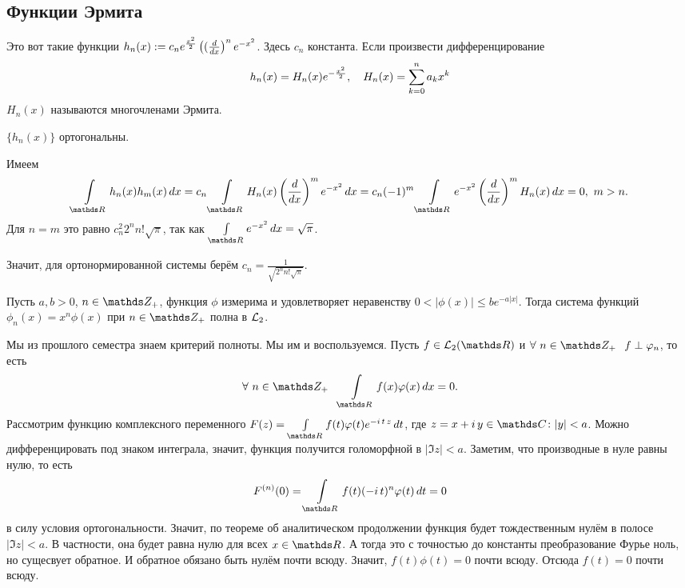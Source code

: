 \subsection{Функции Эрмита}
Это вот такие функции $h_n(x):=c_n e^{\frac{x^2}2}\left((\frac{d }{dx}\right)^ne^{-x^2}$. Здесь $c_n$ константа. Если произвести дифференцирование
\[
  h_n(x) = H_n(x) e^{-\frac{x^2}2},\quad H_n(x) = \sum\limits_{k = 0}^{n} a_k x^k
\]
$H_n(x)$ называются многочленами Эрмита.

\begin{Ut}
$\big\{h_n(x)\big\}$ ортогональны.
\end{Ut}
\begin{Proof}
  Имеем
\[
  \Gint{\R} h_n(x)h_m(x)\,dx = 
  c_n\Gint{\R} H_n(x)\left(\DP { }x\right)^m e^{-x^2}\,dx =
  c_n(-1)^m\Gint{\R} e^{-x^2}\left(\DP { }x\right)^m H_n(x)\,dx = 0,\ m>n.
\]
Для $n=m$ это равно $c_n^2 2^n n!\sqrt{\pi}$, так как $\Gint{\R}e^{-x^2}\,dx = \sqrt\pi$.
\end{Proof}
Значит, для ортонормированной системы берём $c_n = \frac1{\sqrt{2^n n!\sqrt{\pi}}}$.

\begin{Lem}
  Пусть $a,b>0$, $n\in\Z_+$, функция $\phi$ измерима и удовлетворяет неравенству $0<\big|\phi(x)\big|\le b e^{-a|x|}$. Тогда система функций $\phi_n(x) = x^n\phi(x)$ при $n\in\Z_+$ полна в $\mathcal L_2$.
\end{Lem}
\begin{Proof}
Мы из прошлого семестра знаем критерий полноты. Мы им и воспользуемся. Пусть $f\in\L_2(\R)$ и $\forall\ n\in\Z_+\pau f\perp\phi_n$, то есть 
\[
 \forall\ n\in\Z_+\pau \Gint{\R}f(x)\phi(x)\,dx = 0.
\]
Рассмотрим функцию комплексного переменного $F(z) = \Gint{\R}f(t)\phi(t) e^{-i\,t\,z}\,dt$, где $z = x+i\,y\in\C\colon |y|<a$. Можно дифференцировать под знаком интеграла, значит, функция получится голоморфной в $|\Im z|<a$. Заметим, что производные в нуле равны нулю, то есть
\[
  F^{(n)}(0) = \Gint{\R}f(t)(-i\,t)^n\phi(t)\,dt = 0
\]
в силу условия ортогональности. Значит, по теореме об аналитическом продолжении функция будет тождественным нулём в полосе $|\Im z|<a$. В частности, она будет равна нулю для всех $x\in\R$. А тогда это с точностью до константы преобразование Фурье ноль, но сущесвует обратное. И обратное обязано быть нулём почти всюду. Значит, $f(t)\phi(t)=0$ почти всюду. Отсюда $f(t)=0$ почти всюду.
\end{Proof}

